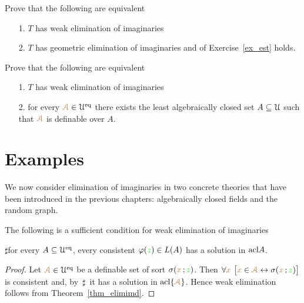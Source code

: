   
  \begin{exercise}\label{ex_wei=est+gei}
    Prove that the following are equivalent
    \begin{itemize}
    \item[1.]  $T$ has weak elimination of imaginaries
    \item[2.]  $T$ has geometric elimination of imaginaries and  of Exercise~\ref{ex_est} holds.
    \end{itemize} 
  \end{exercise}
  
  \begin{example}
    Prove that the following are equivalent
    \begin{itemize}
    \item[1.] $T$ has weak elimination of imaginaries
    \item[2.] for every ${\color{brown}\EuScript A}\in \EuScript U^{{\rm eq}}$ there exists the least algebraically closed set $A\subseteq\EuScript U$ such that ${\color{brown}\EuScript A}$ is definable over $A$.
    \end{itemize} 
  \end{example}

\section{Examples}

We now consider elimination of imaginaries in two concrete theories that have been introduced in the previous chapters: 
algebraically closed fields and the random graph.

\begin{lemma}\label{tvtestimmaginari}
The following is a sufficient condition for weak elimination of imaginaries

$\sharp$\qquad for every $A\subseteq\EuScript U^{{\rm eq}}$, every consistent $\varphi({\color{green} z})\in L(A)$ has a solution in ${\rm acl} A$.
\end{lemma}

\begin{proof}
Let ${\color{brown}\EuScript A}\in\EuScript U^{{\rm eq}}$ be a definable set of sort $\sigma({\color{brown} x}\,;{\color{green} z})$.
Then $\forall{\color{brown}x}\ \big[{\color{brown} x}\in{\color{brown}\EuScript A}\leftrightarrow\sigma({\color{brown} x}\,;{\color{green} z})\big]$ is consistent and, by $\,\sharp\,$ it has a solution in ${\rm acl}\{{\color{brown}\EuScript A}\}$.
Hence weak elimination follows from Theorem~\ref{thm_elimimd}.
\end{proof}

